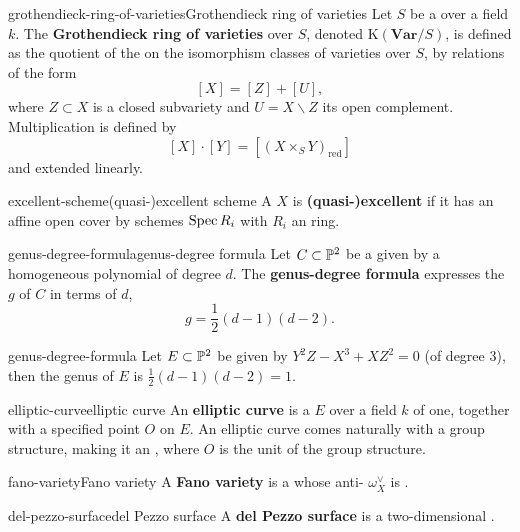\begin{topic}{grothendieck-ring-of-varieties}{Grothendieck ring of varieties}
    Let $S$ be a  over a field $k$. The \textbf{Grothendieck ring of varieties} over $S$, denoted $\text{K}(\textbf{Var}/S)$, is defined as the quotient of the  on the isomorphism classes of varieties over $S$, by relations of the form
    \[ [X] = [Z] + [U] , \]
    where $Z \subset X$ is a closed subvariety and $U = X \backslash Z$ its open complement. Multiplication is defined by
    \[ [X] \cdot [Y] = [(X \times_S Y)_\text{red}] \]
    and extended linearly.
\end{topic}

\begin{topic}{excellent-scheme}{(quasi-)excellent scheme}
    A  $X$ is \textbf{(quasi-)excellent} if it has an affine open cover by schemes $\operatorname{Spec} R_i$ with $R_i$ an  ring.
\end{topic}

\begin{topic}{genus-degree-formula}{genus-degree formula}
    Let $C \subset \mathbb{P}^2$ be a   given by a homogeneous polynomial of degree $d$. The \textbf{genus-degree formula} expresses the  $g$ of $C$ in terms of $d$,
    \[ g = \frac{1}{2}(d - 1)(d - 2) . \]
\end{topic}

\begin{example}{genus-degree-formula}
    Let $E \subset \mathbb{P}^2$ be given by $Y^2Z - X^3 + XZ^2 = 0$ (of degree $3$), then the genus of $E$ is $\frac{1}{2}(d - 1)(d - 2) = 1$.
\end{example}

\begin{topic}{elliptic-curve}{elliptic curve}
    An \textbf{elliptic curve} is a    $E$ over a field $k$ of  one, together with a specified point $O$ on $E$. An elliptic curve comes naturally with a group structure, making it an , where $O$ is the unit of the group structure.
\end{topic}

\begin{topic}{fano-variety}{Fano variety}
    A \textbf{Fano variety} is a  whose anti- $\omega_X^\vee$ is .
\end{topic}


\begin{topic}{del-pezzo-surface}{del Pezzo surface}
    A \textbf{del Pezzo surface} is a two-dimensional .
\end{topic}